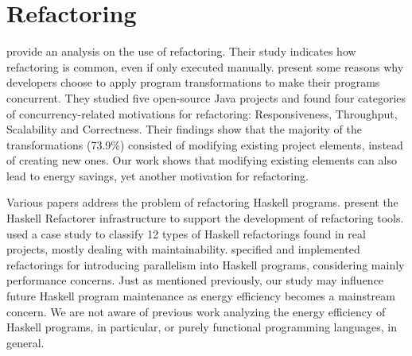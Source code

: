\section{Refactoring}
 provide an analysis on the use of refactoring. Their study indicates how refactoring is common, even if only executed manually.  present some reasons why developers choose to apply program transformations to make their programs concurrent. They studied five open-source Java projects and found four categories of concurrency-related motivations for refactoring: Responsiveness, Throughput, Scalability and Correctness. Their findings show that the majority of the transformations (73.9\%) consisted of modifying existing project elements, instead of creating new ones. Our work shows that modifying existing elements can also lead to energy savings, yet another motivation for refactoring.

Various papers address the problem of refactoring Haskell programs.  present the Haskell Refactorer infrastructure to support the development of refactoring tools.  used a case study to classify 12 types of Haskell refactorings found in real projects, mostly dealing with maintainability.  specified and implemented refactorings for introducing parallelism into Haskell programs, considering mainly performance concerns. Just as mentioned previously, our study may influence future Haskell program maintenance as energy efficiency becomes a mainstream concern. We are not aware of previous work analyzing the energy efficiency of Haskell programs, in particular, or purely functional programming languages, in general.
